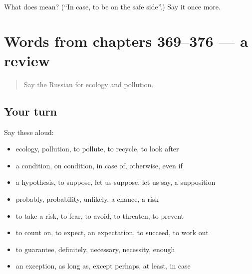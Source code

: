 \begin{tcolorbox}[breakable,colback=teal!4,colframe=teal!35!black,title={Before you move on}]
What does    mean? (\textquotedblleft{}In case, to be on the safe side\textquotedblright{}.) Say it once more.
\end{tcolorbox}
\section[(dialogue)]{Words from chapters 369–376 — a review}

\label{lesson:RU-R376-review-369-376}



\begin{quote}
Say the Russian for ecology and pollution.
\end{quote}

\subsection*{Your turn}
Say these aloud:

\begin{itemize}
\raggedright
  \item ecology, pollution, to pollute, to recycle, to look after
  \item a condition, on condition, in case of, otherwise, even if
  \item a hypothesis, to suppose, let us suppose, let us say, a supposition
  \item probably, probability, unlikely, a chance, a risk
  \item to take a risk, to fear, to avoid, to threaten, to prevent
  \item to count on, to expect, an expectation, to succeed, to work out
  \item to guarantee, definitely, necessary, necessity, enough
  \item an exception, as long as, except perhaps, at least, in case
\end{itemize}

